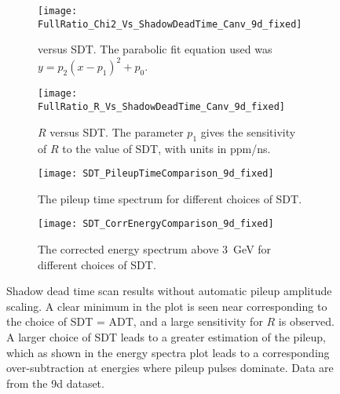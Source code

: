 \begin{figure}
\centering
    \begin{subfigure}[t]{0.45\textwidth}
        \centering
        \texttt{[image: FullRatio\_Chi2\_Vs\_ShadowDeadTime\_Canv\_9d\_fixed]}
        \caption{\chisq versus SDT. The parabolic fit equation used was $y = p_{2}(x - p_{1})^{2} + p_{0}.$}
    \end{subfigure}%
    \hspace{1cm}
    \begin{subfigure}[t]{0.45\textwidth}
        \centering
        \texttt{[image: FullRatio\_R\_Vs\_ShadowDeadTime\_Canv\_9d\_fixed]}
        \caption{$R$ versus SDT. The parameter $p_{1}$ gives the sensitivity of $R$ to the value of SDT, with units in ppm/ns.}
    \end{subfigure}

    \begin{subfigure}[t]{0.45\textwidth}
        \centering
        \texttt{[image: SDT\_PileupTimeComparison\_9d\_fixed]}
        \caption{The pileup time spectrum for different choices of SDT.}
    \end{subfigure}%
    \hspace{1cm}
    \begin{subfigure}[t]{0.45\textwidth}
        \centering
        \texttt{[image: SDT\_CorrEnergyComparison\_9d\_fixed]}
        \caption{The corrected energy spectrum above \SI{3}{\GeV} for different choices of SDT.}
    \end{subfigure}
\caption[Pileup shadow dead time scan without automatic pileup amplitude scaling]{Shadow dead time scan results without automatic pileup amplitude scaling. A clear minimum in the \chisq plot is seen near  corresponding to the choice of SDT = ADT, and a large sensitivity for $R$ is observed. A larger choice of SDT leads to a greater estimation of the pileup, which as shown in the energy spectra plot leads to a corresponding over-subtraction at energies where pileup pulses dominate. Data are from the 9d dataset.}
\label{fig:SDTscan_noScaling}
\end{figure}


